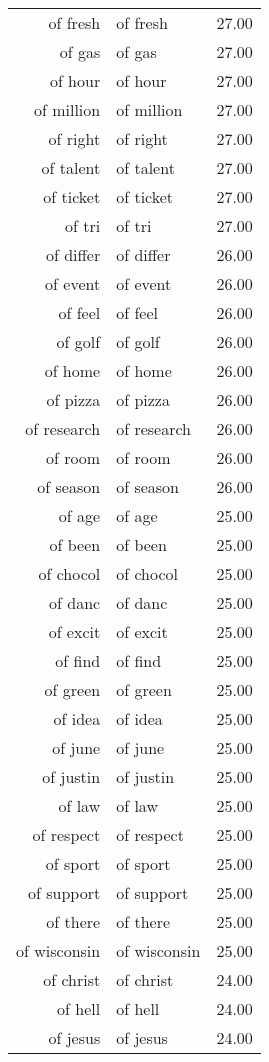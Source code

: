 \begin{table}[ht]
\begin{tabular}{rlr}
  of fresh & of fresh & 27.00 \\ 
  of gas & of gas & 27.00 \\ 
  of hour & of hour & 27.00 \\ 
  of million & of million & 27.00 \\ 
  of right & of right & 27.00 \\ 
  of talent & of talent & 27.00 \\ 
  of ticket & of ticket & 27.00 \\ 
  of tri & of tri & 27.00 \\ 
  of differ & of differ & 26.00 \\ 
  of event & of event & 26.00 \\ 
  of feel & of feel & 26.00 \\ 
  of golf & of golf & 26.00 \\ 
  of home & of home & 26.00 \\ 
  of pizza & of pizza & 26.00 \\ 
  of research & of research & 26.00 \\ 
  of room & of room & 26.00 \\ 
  of season & of season & 26.00 \\ 
  of age & of age & 25.00 \\ 
  of been & of been & 25.00 \\ 
  of chocol & of chocol & 25.00 \\ 
  of danc & of danc & 25.00 \\ 
  of excit & of excit & 25.00 \\ 
  of find & of find & 25.00 \\ 
  of green & of green & 25.00 \\ 
  of idea & of idea & 25.00 \\ 
  of june & of june & 25.00 \\ 
  of justin & of justin & 25.00 \\ 
  of law & of law & 25.00 \\ 
  of respect & of respect & 25.00 \\ 
  of sport & of sport & 25.00 \\ 
  of support & of support & 25.00 \\ 
  of there & of there & 25.00 \\ 
  of wisconsin & of wisconsin & 25.00 \\ 
  of christ & of christ & 24.00 \\ 
  of hell & of hell & 24.00 \\ 
  of jesus & of jesus & 24.00 \\ 

\end{tabular}
\end{table}
